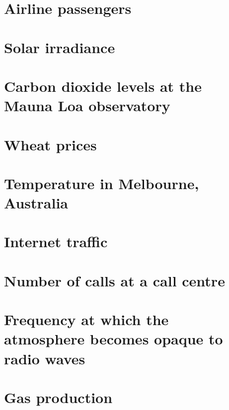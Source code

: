 \section{Airline passengers}


\section{Solar irradiance}


\section{Carbon dioxide levels at the Mauna Loa observatory}


\section{Wheat prices}


\section{Temperature in Melbourne, Australia}


\section{Internet traffic}


\section{Number of calls at a call centre}


\section{Frequency at which the atmosphere becomes opaque to radio waves}


\section{Gas production}

